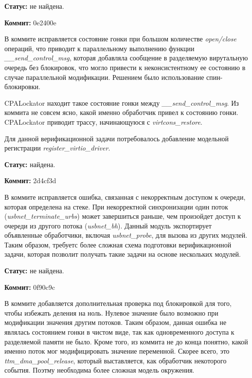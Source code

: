 \textbf{Статус:} не найдена.

\vspace{1cm}

\textbf{Коммит:} 0e2400e

В коммите исправляется состояние гонки при большом количестве \textit{open/close} операций, что приводит к параллельному выполнению функции \textit{\_\_send\_control\_msg}, которая добавляла сообщение в разделяемую вирутальную очередь без блокировок, что могло привести к неконсистентному ее состоянию в случае параллельной модификации.
Решением было использование спин-блокировки.

CPALockator находит такое состояние гонки между \textit{\_\_send\_control\_msg}.
Из коммита не совсем ясно, какой именно обработчик привел к состоянию гонки. 
CPALockator приводит трассу, начинающуюся с \textit{virtcons\_restore}. 

Для данной верификационной задачи потребовалось добавление модельной регистрации \textit{register\_virtio\_driver}.

\textbf{Статус:} найдена.

\vspace{1cm}

\textbf{Коммит:} 2d4cf3d

В коммите исправляется ошибка, связанная с некорректным доступом к очереди, которая определена на стеке.
При некорректной синхронизации один поток (\textit{usbnet\_terminate\_urbs}) может завершиться раньше, чем произойдет доступ к очереди из другого потока (\textit{usbnet\_bh}).
Данный модуль экспортирует объявленные обработчики, включая \textit{usbnet\_probe}, для вызова из других модулей. 
Таким образом, требуетс более сложная схема подготовки верификационной задачи, которая позволит получать такие задачи на основе нескольких модулей.

\textbf{Статус:} не найдена.

\vspace{1cm}

\textbf{Коммит:} 0f90c9c

В коммите добавляется дополнительная проверка под блокировкой для того, чтобы избежать деления на ноль.
Нулевое значение было возможно при модификации значения другим потоков.
Таким образом, данная ошибка не являлась состоянием гонки в чистом виде, так как одновременного доступа к разделяемой памяти не было.
Кроме того, из коммита не до конца понятно, какой именно поток мог модифицировать значение переменной.
Скорее всего, это \textit{ttm\_dma\_pool\_release}, который выставляется, как обработчик некоторого события.
Поэтму необходима более сложная модель окружения.

